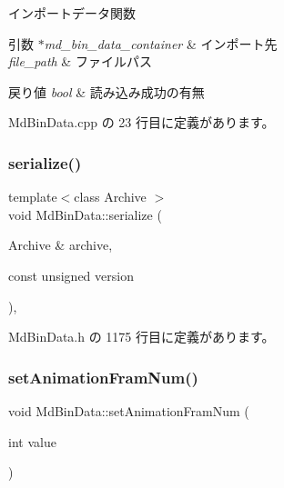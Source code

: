 インポートデータ関数 


\begin{DoxyParams}{引数}
{\em $\ast$md\+\_\+bin\+\_\+data\+\_\+container} & インポート先 \\
\hline
{\em file\+\_\+path} & ファイルパス \\
\hline
\end{DoxyParams}

\begin{DoxyRetVals}{戻り値}
{\em bool} & 読み込み成功の有無 \\
\hline
\end{DoxyRetVals}


 Md\+Bin\+Data.\+cpp の 23 行目に定義があります。

\mbox{\label{class_md_bin_data_a3311ed96bf9545d30a9b08c6649078a9}} 
\subsubsection{\texorpdfstring{serialize()}{serialize()}}
{\footnotesize\ttfamily template$<$class Archive $>$ \\
void Md\+Bin\+Data\+::serialize (\begin{DoxyParamCaption}\item[{Archive \&}]{archive,  }\item[{const unsigned}]{version }\end{DoxyParamCaption})\hspace{0.3cm}{\ttfamily [inline]}, {\ttfamily [private]}}



 Md\+Bin\+Data.\+h の 1175 行目に定義があります。

\mbox{\label{class_md_bin_data_a656893994f5197194cae842918090f59}} 
\subsubsection{\texorpdfstring{set\+Animation\+Fram\+Num()}{setAnimationFramNum()}}
{\footnotesize\ttfamily void Md\+Bin\+Data\+::set\+Animation\+Fram\+Num (\begin{DoxyParamCaption}\item[{int}]{value }\end{DoxyParamCaption})}



